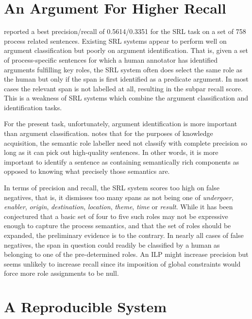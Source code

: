 \documentclass{article} %
\begin{document}
\section{An Argument For Higher Recall}
\cite{sl} reported a best precision/recall of 0.5614/0.3351 for the SRL task on a set of 758 process related sentences.  Existing SRL systems appear to perform well on argument classification but poorly on argument identification.  That is, given a set of process-specific sentences for which a human annotator has identified arguments fulfilling key roles, the SRL system often does select the same role as the human but only if the span is first identified as a predicate argument.  In most cases the relevant span is not labelled at all, resulting in the subpar recall score.  This is a weakness of SRL systems which combine the argument classification and identification tasks.

For the present task, unfortunately, argument identification is more important than argument classification.  \cite{bala} notes that for the purposes of knowledge acquisition, the semantic role labeller need not classify with complete precision so long as it can pick out high-quality sentences.  In other words, it is more important to identify a sentence as containing semantically rich components as opposed to knowing what precisely those semantics are.

In terms of precision and recall, the SRL system scores too high on false negatives, that is, it dismisses too many spans as not being one of {\it undergoer}, {\it enabler}, {\it origin}, {\it destination}, {\it location}, {\it theme}, {\it time} or {\it result}.  While it has been conjectured that a basic set of four to five such roles may not be expressive enough to capture the process semantics, and that the set of roles should be expanded, the preliminary evidence is to the contrary.  In nearly all cases of false negatives, the span in question could readily be classified by a human as belonging to one of the pre-determined roles.  An ILP might increase precision but seems unlikely to increase recall since its imposition of global constraints would force more role assignments to be null.  

\section{A Reproducible System}
\end{document}
